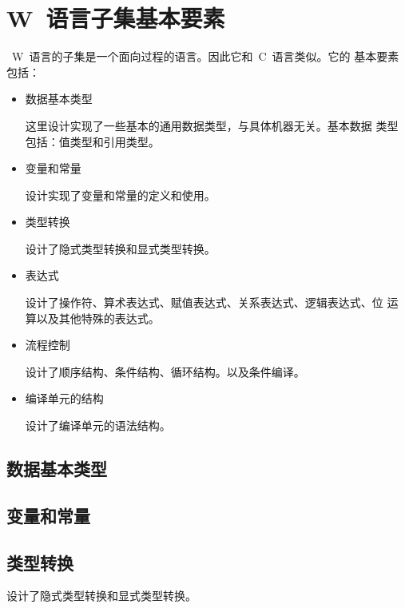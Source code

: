 \chapter{W~语言子集基本要素}

~W~语言的子集是一个面向过程的语言。因此它和~C~语言类似。它的
基本要素包括：

\begin{itemize}
\item{数据基本类型}

这里设计实现了一些基本的通用数据类型，与具体机器无关。基本数据
类型包括：值类型和引用类型。

\item{变量和常量}

设计实现了变量和常量的定义和使用。

\item{类型转换}

设计了隐式类型转换和显式类型转换。

\item{表达式}

设计了操作符、算术表达式、赋值表达式、关系表达式、逻辑表达式、位
运算以及其他特殊的表达式。

\item{流程控制}

设计了顺序结构、条件结构、循环结构。以及条件编译。

\item{编译单元的结构}

设计了编译单元的语法结构。

\end{itemize}

\section{数据基本类型}



\section{变量和常量}



\section{类型转换}

设计了隐式类型转换和显式类型转换。

